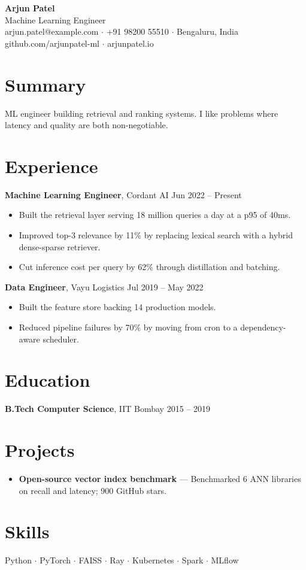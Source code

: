 \documentclass[11pt,a4paper]{article}
\begin{document}
\begin{center}
{\LARGE \textbf{Arjun Patel}} \\[3pt]
Machine Learning Engineer \\[2pt]
arjun.patel@example.com $\cdot$ +91 98200 55510 $\cdot$ Bengaluru, India \\
github.com/arjunpatel-ml $\cdot$ arjunpatel.io
\end{center}

\section{Summary}
ML engineer building retrieval and ranking systems. I like problems where latency and quality are both non-negotiable.

\section{Experience}
\textbf{Machine Learning Engineer}, Cordant AI \hfill Jun 2022 – Present

\begin{itemize}
  \item Built the retrieval layer serving 18 million queries a day at a p95 of 40ms.
  \item Improved top-3 relevance by 11\% by replacing lexical search with a hybrid dense-sparse retriever.
  \item Cut inference cost per query by 62\% through distillation and batching.
\end{itemize}

\textbf{Data Engineer}, Vayu Logistics \hfill Jul 2019 – May 2022

\begin{itemize}
  \item Built the feature store backing 14 production models.
  \item Reduced pipeline failures by 70\% by moving from cron to a dependency-aware scheduler.
\end{itemize}

\section{Education}
\textbf{B.Tech Computer Science}, IIT Bombay \hfill 2015 – 2019

\section{Projects}
\begin{itemize}
  \item \textbf{Open-source vector index benchmark} --- Benchmarked 6 ANN libraries on recall and latency; 900 GitHub stars.
\end{itemize}

\section{Skills}
Python $\cdot$ PyTorch $\cdot$ FAISS $\cdot$ Ray $\cdot$ Kubernetes $\cdot$ Spark $\cdot$ MLflow
\end{document}
